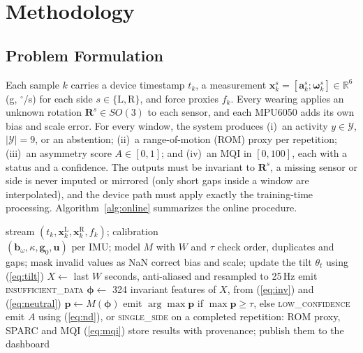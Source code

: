 \documentclass[conference]{IEEEtran}
\newcommand{\vect}[1]{\mathbf{#1}}
\begin{document}
\section{Methodology}

\subsection{Problem Formulation}
Each sample $k$ carries a device timestamp $t_k$, a measurement $\vect{x}^s_k=[\vect{a}^s_k;\boldsymbol{\omega}^s_k]\in\mathbb{R}^6$ (g, $^\circ$/s) for each side $s\in\{\mathrm{L},\mathrm{R}\}$, and force proxies $f_k$. Every wearing applies an unknown rotation $\vect{R}^s\in SO(3)$ to each sensor, and each MPU6050 adds its own bias and scale error. For every window, the system produces (i)~an activity $y\in\mathcal{Y}$, $|\mathcal{Y}|=9$, or an abstention; (ii)~a range-of-motion (ROM) proxy per repetition; (iii)~an asymmetry score $A\in[0,1]$; and (iv)~an MQI in $[0,100]$, each with a status and a confidence. The outputs must be invariant to $\vect{R}^s$, a missing sensor or side is never imputed or mirrored (only short gaps inside a window are interpolated), and the device path must apply exactly the training-time processing. Algorithm~\ref{alg:online} summarizes the online procedure.

\begin{algorithm}[t]
\caption{Online processing of one device stream}
\label{alg:online}
\begin{algorithmic}[1]
\small
\REQUIRE stream $(t_k,\vect{x}^{\mathrm{L}}_k,\vect{x}^{\mathrm{R}}_k,f_k)$; calibration\\ $(\vect{b}_\omega,\kappa,\vect{g}_0,\vect{u})$ per IMU; model $M$ with $W$ and $\tau$
\STATE check order, duplicates and gaps; mask invalid values as NaN
\STATE correct bias and scale; update the tilt $\theta_t$ using (\ref{eq:tilt})
\STATE $X\leftarrow$ last $W$ seconds, anti-aliased and resampled to 25\,Hz
\STATE emit \textsc{insufficient\_data}
\ELSE
\STATE $\boldsymbol{\phi}\leftarrow$ 324 invariant features of $X$, from (\ref{eq:inv}) and (\ref{eq:neutral})
\STATE $\vect{p}\leftarrow M(\boldsymbol{\phi})$
\STATE emit $\arg\max\vect{p}$ if $\max\vect{p}\ge\tau$, else \textsc{low\_confidence}
\STATE emit $A$ using (\ref{eq:nd}), or \textsc{single\_side}
\ENDIF
\ENDIF
\STATE on a completed repetition: ROM proxy, SPARC and MQI (\ref{eq:mqi})
\STATE store results with provenance; publish them to the dashboard
\ENDFOR
\end{algorithmic}
\end{algorithm}
\end{document}
